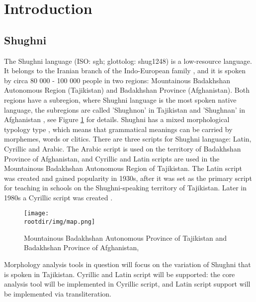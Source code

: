 \section{Introduction}
\subsection{Shughni}
\par The Shughni language (ISO: sgh; glottolog: shug1248) is a low-resource language. It belongs to the Iranian branch of the Indo-European family \parencite[12]{plungian_study_2022}, and it is spoken by circa 80 000 - 100 000 people \parencite{edelman_dodykhudoeva_shughni_2009} in two regions: Mountainous Badakhshan Autonomous Region (Tajikistan) and Badakhshan Province (Afghanistan). Both regions have a subregion, where Shughni language is the most spoken native language, the subregions are called 'Shughnon' in Tajikistan and 'Shughnan' in Afghanistan \parencite[2]{parker_shughni_2023}, see Figure \ref{fig:map1} for details. Shughni has a mixed morphological typology type \parencite[94]{parker_shughni_2023}, which means that grammatical meanings can be carried by morphemes, words or clitics. There are three scripts for Shughni language: Latin, Cyrillic and Arabic. The Arabic script is used on the territory of Badakhshan Province of Afghanistan, and Cyrillic and Latin scripts are used in the Mountainous Badakhshan Autonomous Region of Tajikistan. The Latin script was created and gained popularity in 1930s, after it was set as the primary script for teaching in schools on the Shughni-speaking territory of Tajikistan. Later in 1980s a Cyrillic script was created \parencite[788]{edelman_dodykhudoeva_shughni_2009}.
\begin{figure}[h]
    \centering
    \texttt{[image: \\rootdir/img/map.png]}
    \caption{Mountainous Badakhshan Autonomous Province of Tajikistan and Badakhshan Province of Afghanistan, \parencite[Fig 1.1]{parker_shughni_2023}}
    \label{fig:map1}
\end{figure}
\par Morphology analysis tools in question will focus on the variation of Shughni that is spoken in Tajikistan. Cyrillic and Latin script will be supported: the core analysis tool will be implemented in Cyrillic script, and Latin script support will be implemented via transliteration.

